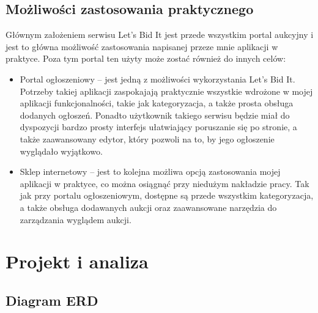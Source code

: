 \documentclass[brudnopis]{xmgr}
\begin{document}
\section{Możliwości zastosowania praktycznego}
Głównym założeniem serwisu Let's Bid It jest przede wszystkim portal aukcyjny i jest to główna możliwość zastosowania napisanej przeze mnie aplikacji w praktyce. Poza tym portal ten użyty może zostać również do innych celów:

\begin{itemize}

\item Portal ogłoszeniowy – jest jedną z możliwości wykorzystania Let's Bid It. Potrzeby takiej aplikacji zaspokajają praktycznie wszystkie wdrożone w mojej aplikacji funkcjonalności, takie jak kategoryzacja, a także prosta obsługa dodanych ogłoszeń. Ponadto użytkownik takiego  serwisu będzie miał do dyspozycji bardzo prosty interfejs ułatwiający poruszanie się po stronie, a także zaawansowany edytor, który pozwoli na to, by jego ogłoszenie wyglądało wyjątkowo.

\item Sklep internetowy – jest to kolejna możliwa opcją zastosowania mojej aplikacji w praktyce, co można osiągnąć przy niedużym nakładzie pracy. Tak jak przy portalu ogłoszeniowym, dostępne są przede wszystkim kategoryzacja, a także obsługa dodawanych aukcji oraz zaawansowane narzędzia do zarządzania wyglądem aukcji.

\end{itemize}

\chapter{Projekt i analiza}

\section{Diagram ERD}
\end{document}
